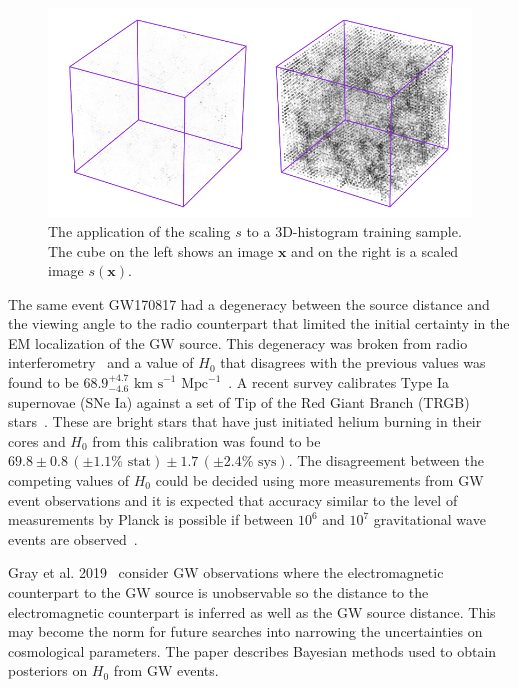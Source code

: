 \documentclass[twocolumn]{article}
\numberwithin{equation}{section}
\begin{document}
\begin{figure}
\includegraphics[width=\columnwidth]{figures/diagrams/scale_fig.png}%
\centering
\caption{The application of the scaling $s$ to a 3D-histogram training sample. The cube on the left shows an 
image $\mathbf{x}$ and on the right is a scaled image $s(\mathbf{x})$.}
\label{fig:scaling}
\end{figure}

The same event GW170817 had a degeneracy between the source distance and the viewing angle to the radio counterpart that 
limited the initial certainty in the EM localization of the GW source. This degeneracy was broken from radio 
interferometry~\cite{GW170817_source_radio} and a value of $H_0$ that disagrees with the previous values was found to be 
$68.9^{+4.7}_{-4.6} \text{ km s}^{-1} \text{ Mpc}^{-1}$~\cite{GW170817_jet_H0}. A recent survey calibrates Type Ia 
supernovae (SNe Ia) against a set of Tip of the Red Giant Branch (TRGB) stars~\cite{H0_redgiant}. These are bright stars
that have just initiated helium burning in their cores and $H_0$ from this calibration was found to be $69.8 \pm 0.8 \, 
(\pm1.1\% \text{ stat}) \pm 1.7 \, (\pm2.4\% \text{ sys})$. The disagreement between the competing values of $H_0$ could
be decided using more measurements from GW event observations and it is expected that accuracy similar to the level of
measurements by Planck is possible if between $10^6$ and $10^7$ gravitational wave events are 
observed~\cite{chris_planck_gw}.

Gray et al. 2019~\cite{gray} consider GW observations where the electromagnetic counterpart to the GW source is
unobservable so the distance to the electromagnetic counterpart is inferred as well as the GW source distance. This 
may become the norm for future searches into narrowing the uncertainties on cosmological parameters. The paper 
describes Bayesian methods used to obtain posteriors on $H_0$ from GW events.
\end{document}
